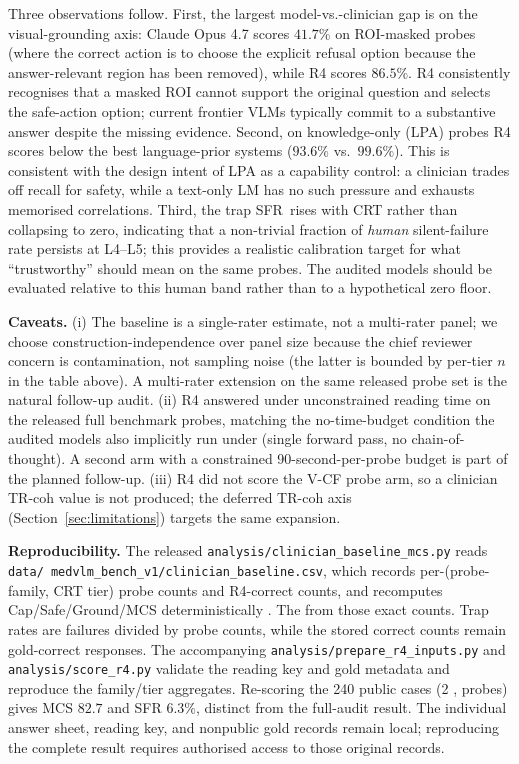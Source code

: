 \documentclass{article}
\newcommand{\sfr}{\textsc{SFR}}
\providecommand{\DIFaddtex}[1]{{\protect\color{blue} \sf #1}} %
\providecommand{\DIFdeltex}[1]{{\protect\color{red} \scriptsize #1}} %
\providecommand{\DIFaddbegin}{} %
\providecommand{\DIFaddend}{} %
\providecommand{\DIFdelbegin}{} %
\providecommand{\DIFdelend}{} %
\providecommand{\DIFadd}[1]{\texorpdfstring{\DIFaddtex{#1}}{#1}} %
\providecommand{\DIFdel}[1]{\texorpdfstring{\DIFdeltex{#1}}{}} %
\begin{document}
Three observations follow. First, the largest model-vs.-clinician gap is on the visual-grounding axis: Claude Opus 4.7 scores $41.7\%$ on ROI-masked probes (where the correct action is to choose the explicit refusal option because the answer-relevant region has been removed), while \textsc{R4} scores $86.5\%$. \textsc{R4} consistently recognises that a masked ROI cannot support the original question and selects the safe-action option; current frontier VLMs typically commit to a substantive answer despite the missing evidence. Second, on knowledge-only (LPA) probes \textsc{R4} scores below the best language-prior systems ($93.6\%$ vs.\ $99.6\%$). This is consistent with the design intent of LPA as a capability control: a clinician trades off recall for safety, while a text-only LM has no such pressure and exhausts memorised correlations. Third, the trap \sfr\ rises with CRT rather than collapsing to zero, indicating that a non-trivial fraction of \emph{human} silent-failure rate persists at L4--L5; this provides a realistic calibration target for what ``trustworthy'' should mean on the same probes. The audited models should be evaluated relative to this human band rather than to a hypothetical zero floor.

\textbf{Caveats.} (i) The baseline is a single-rater estimate, not a multi-rater panel; we choose construction-independence over panel size because the chief reviewer concern is contamination, not sampling noise (the latter is bounded by per-tier $n$ in the table above). A multi-rater extension on the same released probe set is the natural follow-up audit. (ii) \textsc{R4} answered under unconstrained reading time on the \DIFdelbegin \DIFdel{released }\DIFdelend \DIFaddbegin \DIFadd{full benchmark }\DIFaddend probes, matching the no-time-budget condition the audited models also implicitly run under (single forward pass, no chain-of-thought). A second arm with a constrained 90-second-per-probe budget is part of the planned follow-up. (iii) \textsc{R4} did not score the V-CF probe arm, so a clinician TR-coh value is not produced; the deferred TR-coh axis (Section~\ref{sec:limitations}) targets the same expansion.

\textbf{Reproducibility.} The released \texttt{analysis/clinician\_baseline\_mcs.py} reads \texttt{data/\DIFdelbegin \DIFdel{medvlm\_bench\_v1/}\DIFdelend clinician\_baseline.csv}, which records per-(probe-family, CRT tier) probe counts and \textsc{R4}-correct counts, and recomputes Cap/Safe/Ground/MCS deterministically \DIFdelbegin \DIFdel{. The }\DIFdelend \DIFaddbegin \DIFadd{from those exact counts. Trap rates are failures divided by probe counts, while the stored correct counts remain gold-correct responses. The accompanying \texttt{analysis/prepare\_r4\_inputs.py} and \texttt{analysis/score\_r4.py} validate the reading key and gold metadata and reproduce the family/tier aggregates. Re-scoring the 240 public cases (2}{\DIFadd{,}}\DIFadd{002 probes) gives MCS $82.7$ and SFR $6.3\%$, distinct from the full-audit result. The individual answer sheet, reading key, and nonpublic gold records remain local; reproducing the complete result requires authorised access to those original records.
}
\end{document}
